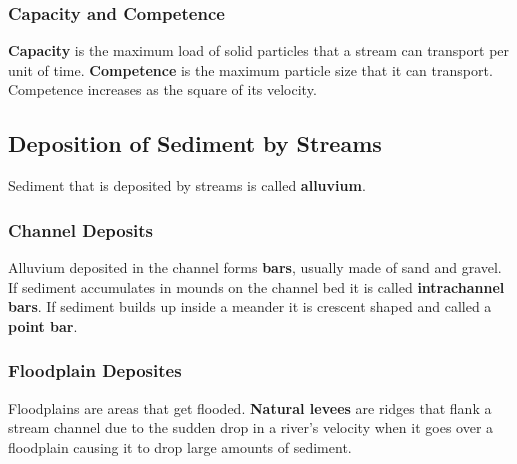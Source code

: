 \documentclass{article}
\begin{document}
\subsubsection{Capacity and Competence} %
\label{ssub:capacity_and_competence}
\textbf{Capacity} is the maximum load of solid particles that a stream can transport per unit of time. \textbf{Competence} is the maximum particle size that it can transport. Competence increases as the square of its velocity.
\subsection{Deposition of Sediment by Streams} %
\label{sub:deposition_of_sediment_by_streams}
Sediment that is deposited by streams is called \textbf{alluvium}.
\subsubsection{Channel Deposits} %
\label{ssub:channel_deposits}
Alluvium deposited in the channel forms \textbf{bars}, usually made of sand and gravel. If sediment accumulates in mounds on the channel bed it is called \textbf{intrachannel bars}. If sediment builds up inside a meander it is crescent shaped and called a \textbf{point bar}.

\subsubsection{Floodplain Deposites} %
\label{ssub:floodplain_deposites}
Floodplains are areas that get flooded. \textbf{Natural levees} are ridges that flank a stream channel due to the sudden drop in a river's velocity when it goes over a floodplain causing it to drop large amounts of sediment.
\end{document}
